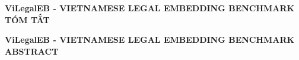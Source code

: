 \begin{center}
	\bfseries\fontsize{14}{16}\selectfont
	ViLegalEB - VIETNAMESE LEGAL EMBEDDING BENCHMARK \\
	\vspace*{0.5cm}
	\fontsize{16}{18}\selectfont
	TÓM TẮT
\end{center}
\vspace*{0.5cm}

\qquad \dotfill

\dotfill

\dotfill

\newpage

\begin{center}
	\bfseries\fontsize{14}{16}\selectfont
	ViLegalEB - VIETNAMESE LEGAL EMBEDDING BENCHMARK \\
	\vspace*{0.5cm}
	\fontsize{16}{18}\selectfont
	ABSTRACT
\end{center}
\vspace*{0.5cm}

\qquad \dotfill

\dotfill

\dotfill

\newpage